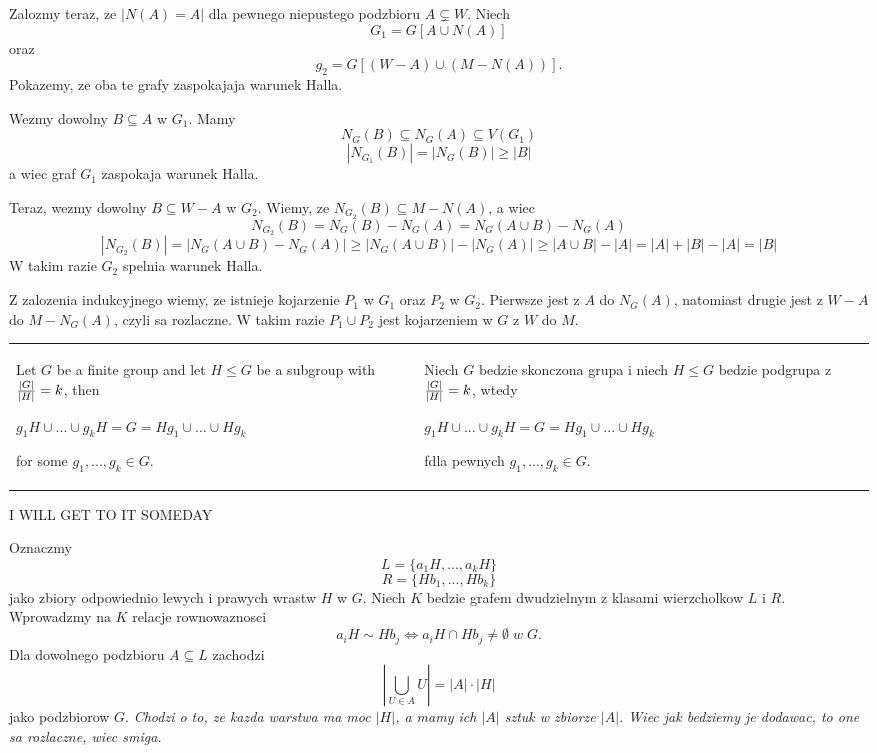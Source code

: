 Zalozmy teraz, ze $|N(A)=A|$ dla pewnego niepustego podzbioru $A\subsetneq W$. Niech
$$G_1=G[A\cup N(A)]$$ 
oraz 
$$g_2=G[(W-A)\cup(M-N(A))].$$
Pokazemy, ze oba te grafy zaspokajaja warunek Halla.

Wezmy dowolny $B\subseteq A$ w $G_1$. Mamy
$$N_G(B)\subseteq N_G(A)\subseteq V(G_1)$$
$$|N_{G_1}(B)|=|N_G(B)|\geq|B|$$
a wiec graf $G_1$ zaspokaja warunek Halla.

Teraz, wezmy dowolny $B\subseteq W-A$ w $G_2$. Wiemy, ze $N_{G_2}(B)\subseteq M-N(A)$, a wiec
$$N_{G_2}(B)= N_G(B)-N_G(A)=N_G(A\cup B)-N_G(A)$$
$$|N_{G_2}(B)|=|N_G(A\cup B)-N_G(A)|\geq |N_G(A\cup B)|-|N_G(A)|\geq |A\cup B|-|A|=|A|+|B|-|A|=|B|$$
W takim razie $G_2$ spelnia warunek Halla.
\smallskip

Z zalozenia indukcyjnego wiemy, ze istnieje kojarzenie $P_1$ w $G_1$ oraz $P_2$ w $G_2$. Pierwsze jest z $A$ do $N_G(A)$, natomiast drugie jest z $W-A$ do $M-N_G(A)$, czyli sa rozlaczne. W takim razie $P_1\cup P_2$ jest kojarzeniem w $G$ z $W$ do $M$.
\bigskip

\bigskip

\begin{tabularx}{\textwidth}{ X!{\color{git90gray}\vrule} X}

    Let $G$ be a finite group and let $H\leq G$ be a subgroup with ${|G|\over|H|}=k$, then

    $g_1H\cup ...\cup g_kH=G=Hg_1\cup...\cup Hg_k$

    for some $g_1,...,g_k\in G$.

    &

    Niech $G$ bedzie skonczona grupa i niech $H\leq G$ bedzie podgrupa z ${|G|\over|H|}=k$, wtedy


    $g_1H\cup ...\cup g_kH=G=Hg_1\cup...\cup Hg_k$
    
    fdla pewnych $g_1,...,g_k\in G$.

\end{tabularx}

\medskip

\medskip

{\color{cyan}I WILL GET TO IT SOMEDAY}

\medskip

Oznaczmy
$$L=\{a_1H,...,a_kH\}$$
$$R=\{Hb_1,...,Hb_k\}$$
jako zbiory odpowiednio lewych i prawych wrastw $H$ w $G$. Niech $K$ bedzie grafem dwudzielnym z klasami wierzcholkow $L$ i $R$. Wprowadzmy na $K$ relacje rownowaznosci
$$a_iH\sim Hb_j\iff a_iH\cap Hb_j\neq\emptyset\;w\;G.$$
Dla dowolnego podzbioru $A\subseteq L$ zachodzi
$$|\bigcup\limits_{U\in A}U|=|A|\cdot|H|$$
jako podzbiorow $G$. \emph{\color{dyg}Chodzi o to, ze kazda warstwa ma moc $|H|$, a mamy ich $|A|$ sztuk w zbiorze $|A|$. Wiec jak bedziemy je dodawac, to one sa rozlaczne, wiec smiga.}

